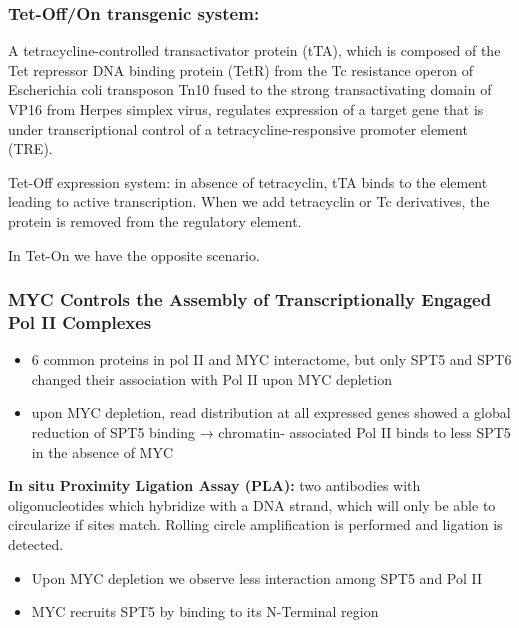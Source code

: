 \hypertarget{tet-offon-transgenic-system}{%
\subsubsection{Tet-Off/On transgenic
system:}\label{tet-offon-transgenic-system}}

A tetracycline-controlled transactivator protein (tTA), which is
composed of the Tet repressor DNA binding protein (TetR) from the Tc
resistance operon of Escherichia coli transposon Tn10 fused to the
strong transactivating domain of VP16 from Herpes simplex virus,
regulates expression of a target gene that is under transcriptional
control of a tetracycline-responsive promoter element (TRE).

Tet-Off expression system: in absence of tetracyclin, tTA binds to the
element leading to active transcription. When we add tetracyclin or Tc
derivatives, the protein is removed from the regulatory element.

In Tet-On we have the opposite scenario.

\hypertarget{myc-controls-the-assembly-of-transcriptionally-engaged-pol-ii-complexes}{%
\subsubsection{MYC Controls the Assembly of Transcriptionally Engaged
Pol II
Complexes}\label{myc-controls-the-assembly-of-transcriptionally-engaged-pol-ii-complexes}}

\begin{itemize}
\tightlist
\item
  6 common proteins in pol II and MYC interactome, but only SPT5 and
  SPT6 changed their association with Pol II upon MYC depletion
\item
  upon MYC depletion, read distribution at all expressed genes showed a
  global reduction of SPT5 binding → chromatin- associated Pol II binds
  to less SPT5 in the absence of MYC
\end{itemize}

\textbf{In situ Proximity Ligation Assay (PLA):} two antibodies with
oligonucleotides which hybridize with a DNA strand, which will only be
able to circularize if sites match. Rolling circle amplification is
performed and ligation is detected.

\begin{itemize}
\tightlist
\item
  Upon MYC depletion we observe less interaction among SPT5 and Pol II
\item
  MYC recruits SPT5 by binding to its N-Terminal region
\end{itemize}

